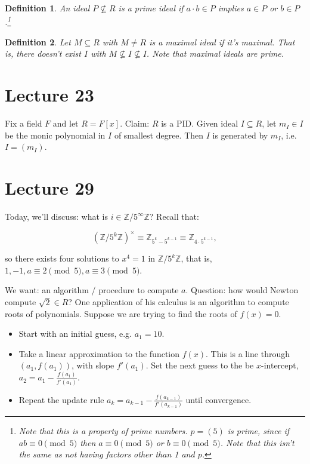 \documentclass[12pt]{article}
\newtheorem*{definition}{Definition}
\def\ZZ{\mathbb{Z}}
\begin{document}
        \begin{definition}
          An ideal $P \not \subseteq R$ is a prime ideal if $a \cdot b \in P$ implies $a \in P$ or $b \in P$.\footnote{Note that this is a property of prime numbers.  $p = (5)$ is prime, since if $ab \equiv 0 \pmod{5}$ then $a \equiv 0 \pmod{5}$ or $b \equiv 0 \pmod{5}$. Note that this isn't the same as not having factors other than 1 and $p$.}
        \end{definition}

        \begin{definition}
          Let $M \subseteq R$  with $M \neq R$ is a maximal ideal if it's maximal.  That is, there doesn't exist $I$ with $M \not \subseteq I \not \subseteq I$.  Note that maximal ideals are prime.
        \end{definition}


  \newpage 

  \section{Lecture 23}

  Fix a field $F$ and let $R = F[x]$.  Claim: $R$ is a PID.  Given ideal $I \subseteq R$, let $m_I \in I$ be the monic polynomial in $I$ of smallest degree.  Then $I$ is generated by $m_I$, i.e. $I = (m_I)$.


  \section{Lecture 29}

  Today, we'll discuss: what is $i \in \ZZ / 5^{\infty} \ZZ$?  Recall that:

  \[
    (\ZZ / 5^k \ZZ)^{\times} \equiv \ZZ_{5^k - 5^{k-1}} \equiv \ZZ_{4 \cdot 5^{k-1}},
  \]

  so there exists four solutions to $x^4 = 1$ in $\ZZ / 5^k \ZZ$, that is, $1, -1, a \equiv 2 \pmod{5}, a \equiv 3 \pmod{5}$.

  We want: an algorithm / procedure to compute $a$.  Question: how would Newton compute $\sqrt{2} \in R$?  One application of his calculus is an algorithm to compute roots of polynomials.  Suppose we are trying to find the roots of $f(x) = 0$.

  \begin{itemize}
    \item Start with an initial guess, e.g. $a_1 = 10$.
    \item Take a linear approximation to the function $f(x)$.  This is a line through $(a_1, f(a_1))$, with slope $f'(a_1)$.  Set the next guess to the be $x$-intercept, $a_2 = a_1 - \frac{f(a_1)}{f'(a_1)}$.
    \item Repeat the update rule $a_k = a_{k-1} - \frac{f(a_{k-1})}{f'(a_{k-1})}$ until convergence.
  \end{itemize}
\end{document}

